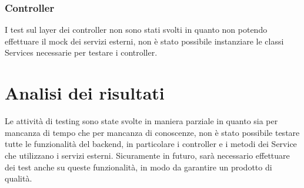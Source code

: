 \subsubsection{Controller}
I test sul layer dei controller non sono stati svolti in quanto non potendo effettuare il mock dei servizi esterni, non è stato possibile instanziare le classi Services necessarie per testare i controller.\\

\section{Analisi dei risultati}
Le attività di testing sono state svolte in maniera parziale in quanto sia per mancanza di tempo che per mancanza di conoscenze, non è stato possibile testare tutte le funzionalità del backend, in particolare i controller e i metodi dei Service che utilizzano i servizi esterni. Sicuramente in futuro, sarà necessario effettuare dei test anche su queste funzionalità, in modo da garantire un prodotto di qualità.\\ 
